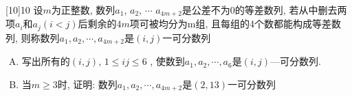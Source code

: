 \documentclass[addtable,twoside,12pt]{hynuexam2024}
\begin{document}
\begin{questions}
		[10]{10}
		\question 设$m$为正整数, 数列$a_{1}$, $ a_{2}$, $\cdots$ $a_{4 m+2}$是公差不为$ 0 $的等差数列, 若从中删去两项$a_{i}$和$a_{j}(i<j)$后剩余的$4m$项可被均分为m组, 且每组的4个数都能构成等差数列, 则称数列$a_{1}, a_{2}, \cdots, a_{4m+2}$是$(i, j  )$一可分数列
		\begin{enumerate}[(A)]
			\item 写出所有的$( i, j)$,   $1 \leq i j \leq 6$ , 使数到$a_{1}, a_{2}, \cdots, a_{6} $是$(i, j)$—可分数列.
			\item 当$m  \geqslant 3$时, 证明: 数列$ a_{1}, a_{2}, \cdots, a_{4m+2}$是$(2,13)$一可分数列
		\end{enumerate}
	\end{questions}
\end{document}
